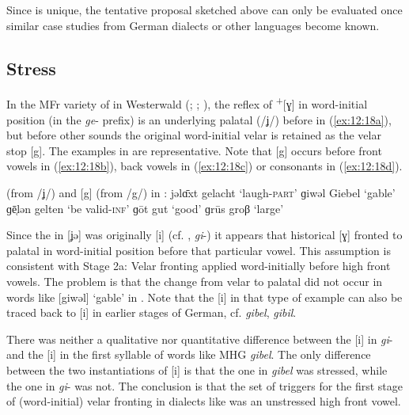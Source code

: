 \pagebreak
Since  is unique, the tentative proposal sketched above can only be evaluated once similar case studies from German dialects or other languages become known.

\subsection{Stress}\label{sec:12.6.3}

In the MFr variety of  in Westerwald (\citealt{Hommer1910}; ; ), the reflex of  \textsuperscript{+}[ɣ] in word-initial position (in the \textit{ge}{}- prefix) is an underlying palatal (/ʝ/) before  in (\ref{ex:12:18a}), but before other sounds the original word-initial velar is retained as the velar stop [g]. The examples in  are representative. Note that [g] occurs before front vowels in (\ref{ex:12:18b}), back vowels in (\ref{ex:12:18c}) or consonants in (\ref{ex:12:18d}).

\ea%
\label{ex:12:18}\relax[ʝ] (from /ʝ/) and [g] (from /g/) in :
\ea\label{ex:12:18a} jǝlɑ̄xt \tab [ʝǝlɑːxt] \tab gelacht \tab ‘laugh\textsc{{}-part}’ 
\ex\label{ex:12:18b} ɡiwǝl \tab [giwǝl] \tab Giebel \tab ‘gable’ \\
    ɡē̜lən \tab [gɛːlǝn] \tab gelten \tab ‘be valid\textsc{{}-inf}’ 
\ex\label{ex:12:18c} ɡōt \tab [goːt] \tab gut \tab ‘good’ 
\ex\label{ex:12:18d} ɡrūs \tab [gruːs] \tab groβ \tab ‘large’ 
\z 
\z 

Since the  in [ʝǝ] was originally [i] (cf. ,  \textit{gi}{}-) it appears that historical [ɣ] fronted to palatal in word-initial position before that particular vowel. This assumption is consistent with Stage 2a: Velar fronting applied word-initially before high front vowels. The problem is that the change from velar to palatal did not occur in words like [giwǝl] ‘gable’ in . Note that the [i] in that type of example can also be traced back to [i] in earlier stages of German, cf.  \textit{gibel},  \textit{gibil}.

There was neither a qualitative nor quantitative difference between the [i] in  \textit{gi}{}- and the [i] in the first syllable of words like MHG \textit{gibel}. The only difference between the two instantiations of [i] is that the one in \textit{gibel} was stressed, while the one in \textit{gi}{}- was not. The conclusion is that the set of triggers for the first stage of (word-initial) velar fronting in dialects like  was an unstressed high front vowel.

